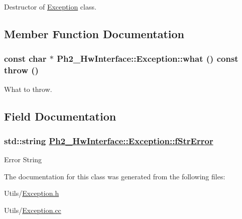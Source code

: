 Destructor of \hyperlink{class_ph2___hw_interface_1_1_exception}{Exception} class. 



\subsection{Member Function Documentation}
\hypertarget{class_ph2___hw_interface_1_1_exception_8db77fef785111589956a21598b748e0}{
\subsubsection[what]{\setlength{\rightskip}{0pt plus 5cm}const char $\ast$ Ph2\_\-Hw\-Interface::Exception::what () const  throw ()}}
\label{class_ph2___hw_interface_1_1_exception_8db77fef785111589956a21598b748e0}


What to throw. 



\subsection{Field Documentation}
\hypertarget{class_ph2___hw_interface_1_1_exception_a060af06e0614e117e2902f41e57e179}{
\subsubsection[fStrError]{\setlength{\rightskip}{0pt plus 5cm}std::string \hyperlink{class_ph2___hw_interface_1_1_exception_a060af06e0614e117e2902f41e57e179}{Ph2\_\-Hw\-Interface::Exception::f\-Str\-Error}}}
\label{class_ph2___hw_interface_1_1_exception_a060af06e0614e117e2902f41e57e179}


Error String 

The documentation for this class was generated from the following files:\begin{CompactItemize}
\item 
Utils/\hyperlink{_exception_8h}{Exception.h}\item 
Utils/\hyperlink{_exception_8cc}{Exception.cc}\end{CompactItemize}

